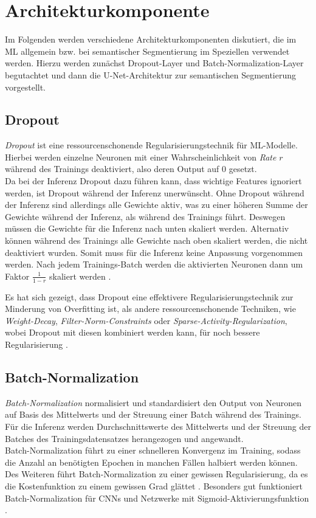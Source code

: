 \section{Architekturkomponente}

Im Folgenden werden verschiedene Architekturkomponenten diskutiert, die im \ac{ML} allgemein 
bzw. bei semantischer Segmentierung im Speziellen verwendet werden. Hierzu werden zunächst Dropout-Layer 
und Batch-Normalization-Layer begutachtet und dann die U-Net-Architektur zur semantischen Segmentierung vorgestellt. 

\subsection{Dropout}

\textit{Dropout} ist eine ressourcenschonende Regularisierungstechnik für \ac{ML}-Modelle. 
Hierbei werden einzelne Neuronen mit einer Wahrscheinlichkeit von \textit{Rate} $r$ während des Trainings 
deaktiviert, also deren Output auf $0$ gesetzt.\\ 
Da bei der Inferenz Dropout dazu führen kann, 
dass wichtige Features ignoriert werden, ist Dropout während der Inferenz unerwünscht. Ohne Dropout während der 
Inferenz sind allerdings alle Gewichte aktiv, was zu einer höheren Summe der Gewichte während der Inferenz, 
als während des Trainings führt. Deswegen müssen die Gewichte für die Inferenz nach unten skaliert werden. 
Alternativ können während des Trainings alle Gewichte nach oben skaliert werden, die nicht deaktiviert wurden. 
Somit muss für die Inferenz keine Anpassung vorgenommen werden. Nach jedem Trainings-Batch werden die aktivierten 
Neuronen dann um Faktor $\frac{1}{1-r}$ skaliert werden \cites[S.~255--258]{Goodfellow.2016}{NitishSrivastava.2014}.

Es hat sich gezeigt, dass Dropout eine effektivere Regularisierungstechnik zur Minderung von Overfitting ist, 
als andere ressourcenschonende Techniken, wie \textit{Weight-Decay}, \textit{Filter-Norm-Constraints} oder 
\textit{Sparse-Activity-Regularization}, wobei Dropout mit diesen kombiniert werden kann, für noch bessere 
Regularisierung \cites[S.~265]{Goodfellow.2016}.

\subsection{Batch-Normalization}

\textit{Batch-Normalization} normalisiert und standardisiert den Output von Neuronen auf Basis des Mittelwerts 
und der Streuung einer Batch während des Trainings. Für die Inferenz werden Durchschnittswerte 
des Mittelwerts und der Streuung der Batches des Trainingsdatensatzes herangezogen und angewandt. \\
Batch-Normalization führt zu einer schnelleren Konvergenz im Training, 
sodass die Anzahl an benötigten Epochen in manchen Fällen halbiert werden können. Des Weiteren führt 
Batch-Normalization zu einer gewissen Regularisierung, da es die Kostenfunktion zu einem gewissen Grad glättet 
\cites[S.~317--320]{Goodfellow.2016}{Ioffe.11022015}.
Besonders gut funktioniert Batch-Normalization für \acp{CNN} und Netzwerke mit Sigmoid-Aktivierungsfunktion
\cites[S.~425]{Goodfellow.2016}.

